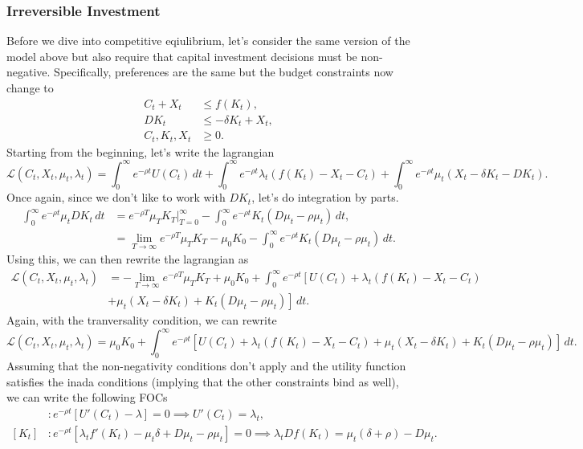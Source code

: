 \documentclass[11pt,english]{article}
\begin{document}
\subsubsection{Irreversible Investment}
Before we dive into competitive eqiulibrium, let's consider the same version of the model above but also require that capital investment decisions must be non-negative. Specifically, preferences are the same but the budget constraints now change to
\begin{align*}
C_t + X_t &\leq f(K_t),\\
DK_t &\leq -\delta K_t + X_t,\\
C_t, K_t, X_t &\geq 0.
\end{align*} Starting from the beginning, let's write the lagrangian $$\mathcal{L}(C_t, X_t, \mu_t, \lambda_t) = \int_0^\infty e^{-\rho t}U(C_t)\,dt + \int_0^\infty e^{-\rho t}\lambda_t(f(K_t) - X_t - C_t) + \int_0^\infty e^{-\rho t} \mu_t(X_t - \delta K_t - DK_t).$$ Once again, since we don't like to work with $DK_t$, let's do integration by parts.
\begin{align*}
\int_0^\infty e^{-\rho t} \mu_t DK_t\,dt &= e^{-\rho T} \mu_T K_T \Big|_{T=0}^\infty - \int_0^\infty e^{-\rho t}K_t(D\mu_t -\rho \mu_t)\,dt,\\
&= \lim_{T\to \infty}e^{-\rho T} \mu_T K_T  - \mu_0K_0 - \int_0^\infty e^{-\rho t}K_t(D\mu_t -\rho \mu_t)\,dt.
\end{align*}Using this, we can then rewrite the lagrangian as 
\begin{align*}
\mathcal{L}(C_t, X_t, \mu_t, \lambda_t) &= -\lim_{T\to \infty}e^{-\rho T} \mu_T K_T  + \mu_0K_0 + \int_0^\infty e^{-\rho t}\left[U(C_t) + \lambda_t(f(K_t) - X_t - C_t)\right. \\
&\left. + \mu_t(X_t - \delta K_t) + K_t(D\mu_t - \rho \mu_t)\right]\,dt.\end{align*}
Again, with the tranversality condition, we can rewrite $$\mathcal{L}(C_t, X_t, \mu_t, \lambda_t) = \mu_0K_0 + \int_0^\infty e^{-\rho t}\left[U(C_t) + \lambda_t(f(K_t) - X_t - C_t) + \mu_t(X_t - \delta K_t) + K_t(D\mu_t - \rho \mu_t)\right]\,dt.$$ Assuming that the non-negativity conditions don't apply and the utility function satisfies the inada conditions (implying that the other constraints bind as well), we can write the following FOCs
\begin{align*}
[C_t]&: e^{-\rho t}[U'(C_t) - \lambda] = 0 \implies U'(C_t) = \lambda_t,\\
[K_t]&: e^{-\rho t}[\lambda_t f'(K_t) - \mu_t \delta + D\mu_t - \rho \mu_t] = 0\implies \lambda_t Df(K_t) = \mu_t(\delta + \rho) - D\mu_t.\\
\end{align*}
\end{document}
